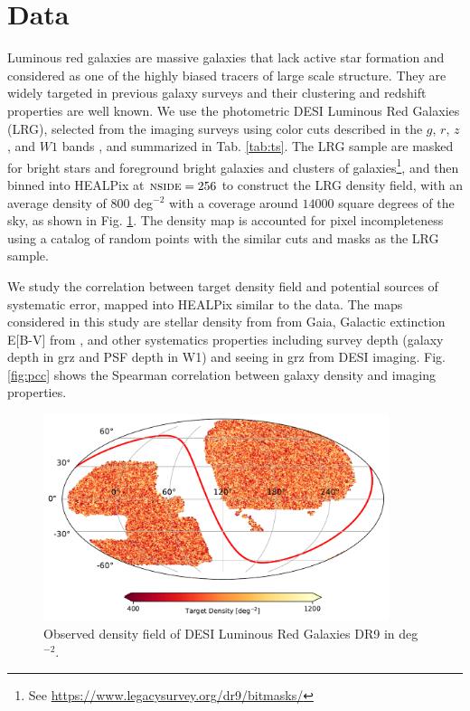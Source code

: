 \section{Data}
\label{sec:data}
Luminous red galaxies are massive galaxies that lack active star formation and considered as one of the highly biased tracers of large scale structure. They are widely targeted in previous galaxy surveys and their clustering and redshift properties are well known. We use the photometric DESI Luminous Red Galaxies (LRG), selected from the imaging surveys \citep{dey2018overview} using color cuts described in the $g$, $r$, $z$, and $W1$ bands \citep[see,][]{zhou2021clustering}, and summarized in Tab. \ref{tab:ts}. The LRG sample are masked for bright stars and foreground bright galaxies and clusters of galaxies\footnote{See \url{https://www.legacysurvey.org/dr9/bitmasks/}}, and then binned into HEALPix \citep{gorski2005healpix} at $\textsc{nside}=256$ to construct the LRG density field, with an average density of $800$ deg$^{-2}$ with a coverage around $14000$ square degrees of the sky, as shown in Fig. \ref{fig:ng}. The density map is accounted for pixel incompleteness using a catalog of random points with the similar cuts and masks as the LRG sample. 

We study the correlation between target density field and potential sources of systematic error, mapped into HEALPix similar to the data. The maps considered in this study are stellar density from  from Gaia,  Galactic extinction E[B-V] from \cite{schlegel1998maps}, and other systematics properties including survey depth (galaxy depth in grz and PSF depth in W1) and seeing in grz from DESI imaging. Fig. \ref{fig:pcc} shows the Spearman correlation between galaxy density and imaging properties. 


\begin{figure}
    \centering
    \includegraphics[width=0.9\textwidth]{figures/lrgdens.pdf}
    \caption{Observed density field of DESI Luminous Red Galaxies DR9 in deg$^{-2}$.}
    \label{fig:ng}
\end{figure}

